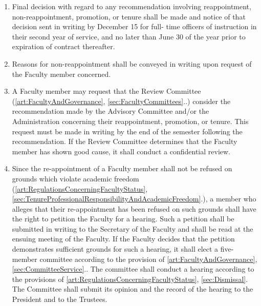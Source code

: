 \documentclass{manual}
\newcommand{\itemLevelA}{\alph*.}
\newcommand{\itemRefA}{\alph*}
\begin{document}
\begin{enumerate}[label=\itemLevelA,ref=\itemRefA]

\item Final decision with regard to any recommendation involving reappointment, non-reappointment, promotion, or tenure shall be made and notice of that decision sent in writing by December 15 for full- time officers of instruction in their second year of service, and no later than June 30 of the year prior to expiration of contract thereafter.

\item Reasons for non-reappointment shall be conveyed in writing upon request of the Faculty member concerned.

\item A Faculty member may request that the Review Committee (\cref{art:FacultyAndGovernance}, \cref{sec:FacultyCommittees}..) consider the recommendation made by the Advisory Committee and/or the Administration concerning their reappointment, promotion, or tenure. This request must be made in writing by the end of the semester following the recommendation. If the Review Committee determines that the Faculty member has shown good cause, it shall conduct a confidential review.

\item Since the re-appointment of a Faculty member shall not be refused on grounds which violate academic freedom (\cref{art:RegulationsConcerningFacultyStatus}, \cref{sec:TenureProfessionalResponsibilityAndAcademicFreedom}.), a member who alleges that their re-appointment has been refused on such grounds shall have the right to petition the Faculty for a hearing. Such a petition shall be submitted in writing to the Secretary of the Faculty and shall be read at the ensuing meeting of the Faculty. If the Faculty decides that the petition demonstrates sufficient grounds for such a hearing, it shall elect a five-member committee according to the provision of \cref{art:FacultyAndGovernance}, \cref{sec:CommitteeService}.. The committee shall conduct a hearing according to the provisions of \cref{art:RegulationsConcerningFacultyStatus}, \cref{sec:Dismissal}. The Committee shall submit its opinion and the record of the hearing to the President and to the Trustees.
\end{enumerate}

\end{document}
